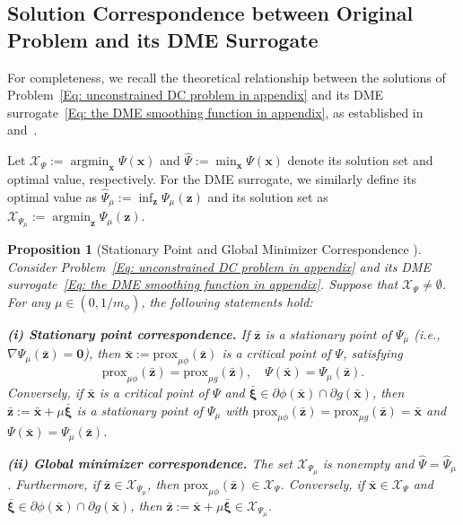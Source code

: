 \documentclass{article}
\theoremstyle{plain}
\newtheorem{proposition}{Proposition}[section]
\theoremstyle{definition}
\theoremstyle{remark}
\newcommand{\zero}{\bm{0}}
\newcommand{\prox}{\mathrm{prox}}
\newcommand{\bx}{\bm{x}}
\newcommand{\bz}{\bm{z}}
\newcommand{\bxi}{\bm{\xi}}
\DeclareMathOperator*{\argmin}{\mathrm{argmin}}
\newcommand{\calX}{\mathcal{X}}
\numberwithin{equation}{section}
\begin{document}
\subsection{{Solution Correspondence between Original Problem and its DME Surrogate}}
\label{App: Solution Correspondence Theory}
For completeness, we recall the theoretical relationship between the solutions of Problem~\eqref{Eq: unconstrained DC problem in appendix} and its DME surrogate~\eqref{Eq: the DME smoothing function in appendix}, as established in~\citet{hiriart1991regularize} and~\citet{sun2023algorithms}.

Let $\calX_{\Psi} := \argmin_{\bx} \Psi(\bx)$ and $\hat{\Psi} := \min_{\bx} \Psi(\bx)$ denote its solution set and optimal value, respectively. For the DME surrogate, we similarly define its optimal value as $\hat{\Psi}_{\mu} := \inf_{\bz} \Psi_{\mu}(\bz)$ and its solution set as $\calX_{\Psi_{\mu}} := \argmin_{\bz} \Psi_{\mu}(\bz)$.

\begin{proposition}[Stationary Point and Global Minimizer Correspondence \cite{hiriart1991regularize}]
\label{Prop: correspondence of stationary point and global minimizer}
Consider Problem~\eqref{Eq: unconstrained DC problem in appendix} and its DME surrogate~\eqref{Eq: the DME smoothing function in appendix}. Suppose that $\calX_{\Psi} \neq\emptyset$. For any $\mu \in (0, 1/m_{\phi})$, the following statements hold:

\textbf{(i) Stationary point correspondence.} If $\bar{\bz}$ is a stationary point of $\Psi_{\mu}$ (i.e., $\nabla \Psi_{\mu}(\bar{\bz}) = \zero$), then $\bar{\bx} := \prox_{\mu\phi}(\bar{\bz})$ is a critical point of $\Psi$, satisfying
\begin{equation}
\label{Eq: stationary identity}
\prox_{\mu\phi}(\bar{\bz}) = \prox_{\mu g}(\bar{\bz}), \quad \Psi(\bar{\bx}) = \Psi_{\mu}(\bar{\bz}).
\end{equation}
Conversely, if $\bar{\bx}$ is a critical point of $\Psi$ and $\bar{\bxi} \in \partial\phi(\bar{\bx}) \cap \partial g(\bar{\bx})$, then $\bar{\bz} := \bar{\bx} + \mu \bar{\bxi}$ is a stationary point of $\Psi_{\mu}$ with $\prox_{\mu \phi}(\bar{\bz}) = \prox_{\mu g}(\bar{\bz}) = \bar{\bx}$ and $\Psi(\bar{\bx}) = \Psi_{\mu}(\bar{\bz})$.

\textbf{(ii) Global minimizer correspondence.} The set $\calX_{\Psi_{\mu}}$ is nonempty and $\hat{\Psi} = \hat{\Psi}_{\mu}$. Furthermore, if $\bar{\bz} \in \calX_{\Psi_{\mu}}$, then $\prox_{\mu \phi}(\bar{\bz}) \in \calX_{\Psi}$. Conversely, if $\bar{\bx} \in \calX_\Psi$ and $\bar{\bxi} \in \partial\phi(\bar{\bx}) \cap \partial g(\bar{\bx})$, then $\bar{\bz} := \bar{\bx} + \mu \bar{\bxi} \in \calX_{\Psi_{\mu}}$.
\end{proposition}
\end{document}
